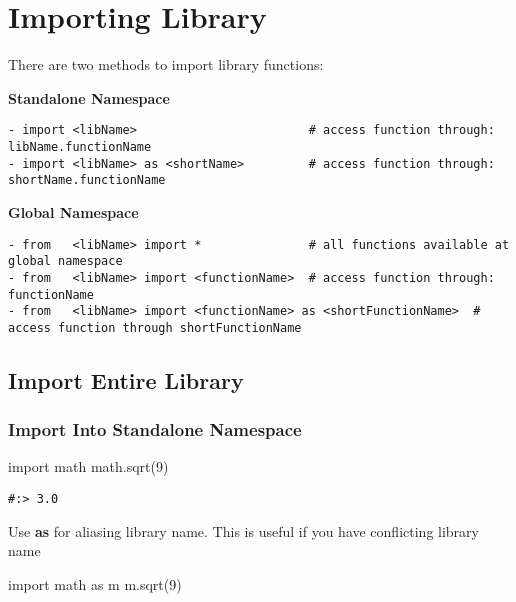 \documentclass[
]{book}
\newenvironment{Shaded}{\begin{snugshade}}{\end{snugshade}}
\newcommand{\DecValTok}[1]{\textcolor[rgb]{0.06,0.06,0.06}{#1}}
\newcommand{\ImportTok}[1]{#1}
\newcommand{\NormalTok}[1]{#1}
\begin{document}
\hypertarget{importing-library}{%
\section{Importing Library}\label{importing-library}}

There are two methods to import library functions:

\textbf{Standalone Namespace}

\begin{verbatim}
- import <libName>                        # access function through: libName.functionName
- import <libName> as <shortName>         # access function through: shortName.functionName
\end{verbatim}

\textbf{Global Namespace}

\begin{verbatim}
- from   <libName> import *               # all functions available at global namespace
- from   <libName> import <functionName>  # access function through: functionName    
- from   <libName> import <functionName> as <shortFunctionName>  # access function through shortFunctionName
\end{verbatim}

\hypertarget{import-entire-library}{%
\subsection{Import Entire Library}\label{import-entire-library}}

\hypertarget{import-into-standalone-namespace}{%
\subsubsection{Import Into Standalone Namespace}\label{import-into-standalone-namespace}}

\begin{Shaded}
\begin{Highlighting}[]
\ImportTok{import}\NormalTok{ math}
\NormalTok{math.sqrt(}\DecValTok{9}\NormalTok{)}
\end{Highlighting}
\end{Shaded}

\begin{verbatim}
#:> 3.0
\end{verbatim}

Use \textbf{as} for aliasing library name. This is useful if you have conflicting library name

\begin{Shaded}
\begin{Highlighting}[]
\ImportTok{import}\NormalTok{ math }\ImportTok{as}\NormalTok{ m}
\NormalTok{m.sqrt(}\DecValTok{9}\NormalTok{)}
\end{Highlighting}
\end{Shaded}
\end{document}
